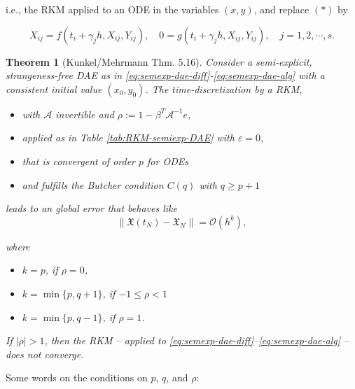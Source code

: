 \documentclass[]{book}
\providecommand{\tightlist}{%
  \setlength{\itemsep}{0pt}\setlength{\parskip}{0pt}}
\newtheorem{theorem}{Theorem}[chapter]
\theoremstyle{definition}
\theoremstyle{definition}
\theoremstyle{definition}
\theoremstyle{remark}
\begin{document}
i.e., the RKM applied to an ODE in the variables \((x,y)\), and replace \((*)\) by

\[
\dot X_{ij} = f(t_i+\gamma_jh, X_{ij}, Y_{ij}),\quad 0 = g(t_i+\gamma_j h, X_{ij}, Y_{ij}), \quad j=1,2,\cdots,s.
\]

\begin{theorem}[Kunkel/Mehrmann Thm. 5.16]
\protect\hypertarget{thm:unnamed-chunk-1}{}{\label{thm:unnamed-chunk-1} {} }Consider a semi-explicit, strangeness-free DAE as in \eqref{eq:semexp-dae-diff}-\eqref{eq:semexp-dae-alg} with a consistent initial value \((x_0, y_0)\). The time-discretization by a RKM,

\begin{itemize}
\tightlist
\item
  with \(\mathcal A\) invertible and \(\rho:=1-\beta^T\mathcal A^{-1}e\),
\item
  applied as in Table \ref{tab:RKM-semiexp-DAE} with \(\varepsilon=0\),
\item
  that is convergent of order \(p\) for ODEs
\item
  and fulfills the \emph{Butcher condition} \(C(q)\) with \(q\geq p+1\)
\end{itemize}

leads to an global error that behaves like
\[
\|\mathfrak X(t_N) - \mathfrak X_N\| = \mathcal O(h^k),
\]

where

\begin{itemize}
\tightlist
\item
  \(k=p\), if \(\rho=0\),
\item
  \(k=\min\{p, q+1\}\), if \(-1\leq \rho < 1\)
\item
  \(k=\min\{p, q-1\}\), if \(\rho =1\).
\end{itemize}

If \(|\rho|>1\), then the RKM -- applied to \eqref{eq:semexp-dae-diff}--\eqref{eq:semexp-dae-alg} -- does not converge.
\end{theorem}

Some words on the conditions on \(p\), \(q\), and \(\rho\):
\end{document}
